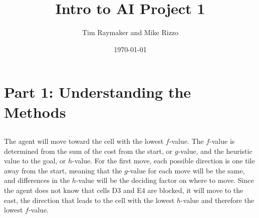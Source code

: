 \documentclass[a4paper,12pt]{article}
\begin{document}
\title{Intro to AI Project 1}
\author{Tim Raymaker and Mike Rizzo}
\date{\today}

\maketitle

\section{Part 1: Understanding the Methods}

\subsection{}
The agent will move toward the cell with the lowest $f$-value. The $f$-value is determined from the sum of the cost from the start, or $g$-value,  and the heuristic value to the goal, or $h$-value. For the first move, each possible direction is one tile away from the start, meaning that the $g$-value for each move will be the same, and differences in the $h$-value will be the deciding factor on where to move. Since the agent does not know that cells D3 and E4 are blocked, it will move to the east, the direction that leads to the cell with the lowest $h$-value and therefore the lowest $f$-value. 
\end{document}

